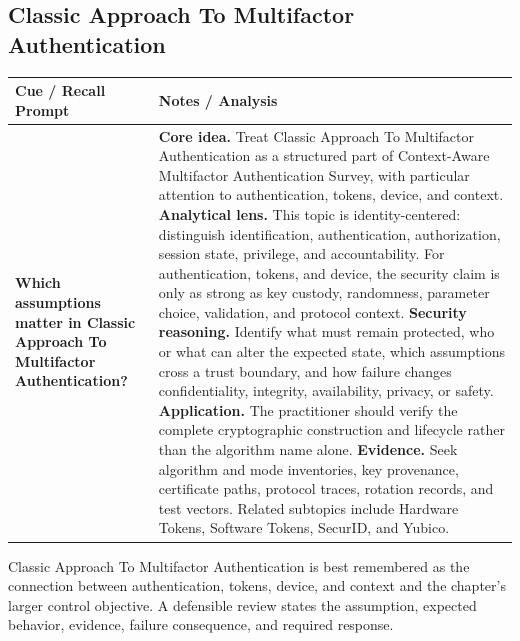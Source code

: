\documentclass[11pt]{article}
\newcommand{\CornellHeader}{%
\rowcolor{Navy}\color{white}\bfseries Cue / Recall Prompt & \color{white}\bfseries Notes / Analysis\\\hline}
\newcommand{\CornellRow}[2]{%
\cellcolor{CueGray}\RaggedRight\textbf{#1} & \RaggedRight #2\\\hline}
\begin{document}
\subsection*{Classic Approach To Multifactor Authentication}
\begin{longtable}{>{\RaggedRight\arraybackslash}p{}|>{\RaggedRight\arraybackslash}p{}}
\CornellHeader
\CornellRow{Which assumptions matter in Classic Approach To Multifactor Authentication?}{\textbf{Core idea.} Treat Classic Approach To Multifactor Authentication as a structured part of Context-Aware Multifactor Authentication Survey, with particular attention to authentication, tokens, device, and context. \textbf{Analytical lens.} This topic is identity-centered: distinguish identification, authentication, authorization, session state, privilege, and accountability. For authentication, tokens, and device, the security claim is only as strong as key custody, randomness, parameter choice, validation, and protocol context. \textbf{Security reasoning.} Identify what must remain protected, who or what can alter the expected state, which assumptions cross a trust boundary, and how failure changes confidentiality, integrity, availability, privacy, or safety. \textbf{Application.} The practitioner should verify the complete cryptographic construction and lifecycle rather than the algorithm name alone. \textbf{Evidence.} Seek algorithm and mode inventories, key provenance, certificate paths, protocol traces, rotation records, and test vectors. Related subtopics include Hardware Tokens, Software Tokens, SecurID, and Yubico.}
\end{longtable}
\begin{topicsummary}
Classic Approach To Multifactor Authentication is best remembered as the connection between authentication, tokens, device, and context and the chapter's larger control objective. A defensible review states the assumption, expected behavior, evidence, failure consequence, and required response.
\end{topicsummary}
\end{document}
